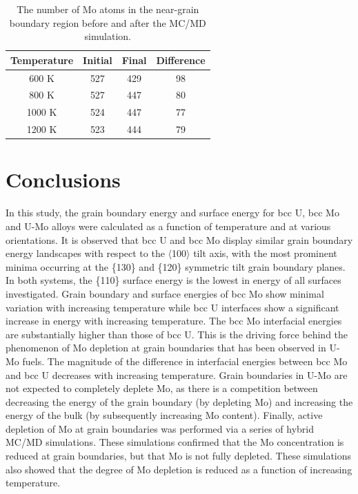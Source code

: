 \documentclass[review]{elsarticle}
\begin{document}
\begin{table}[h]
\caption{The number of Mo atoms in the near-grain boundary region before and after the MC/MD simulation. } \label{tab:mcmdtemp}
\begin{center}
\begin{tabular}{|c|c|c|c|}
	\hline
Temperature & Initial & Final & Difference \\
\hline
600 K & 527 & 429 & 98 \\
800 K & 527 & 447 & 80\\ 
1000 K & 524 & 447 & 77 \\
1200 K & 523 & 444 & 79 \\
 	 \hline
\end{tabular}
\end{center}
\label{default}
\end{table}

\FloatBarrier

\section{Conclusions}

In this study, the grain boundary energy and surface energy for bcc U, bcc Mo and U-Mo alloys were calculated as a function of temperature and at various orientations. It is observed that bcc U and bcc Mo display similar grain boundary energy landscapes with respect to the $\langle$100$\rangle$ tilt axis, with the most prominent minima occurring at the \{130\} and \{120\} symmetric tilt grain boundary planes. In both systems, the \{110\} surface energy is the lowest in energy of all surfaces investigated. Grain boundary and surface energies of bcc Mo show minimal variation with increasing temperature while bcc U interfaces show a significant increase in energy with increasing temperature. The bcc Mo interfacial energies are substantially higher than those of bcc U. This is the driving force behind the phenomenon of Mo depletion at grain boundaries that has been observed in U-Mo fuels. The magnitude of the difference in interfacial energies between bcc Mo and bcc U decreases with increasing temperature. Grain boundaries in U-Mo are not expected to completely deplete Mo, as there is a competition between decreasing the energy of the grain boundary (by depleting Mo) and increasing the energy of the bulk (by subsequently increasing Mo content). Finally, active depletion of Mo at grain boundaries was performed via a series of hybrid MC/MD simulations. These simulations confirmed that the Mo concentration is reduced at grain boundaries, but that Mo is not fully depleted. These simulations also showed that the degree of Mo depletion is reduced as a function of increasing temperature. 
\end{document}
